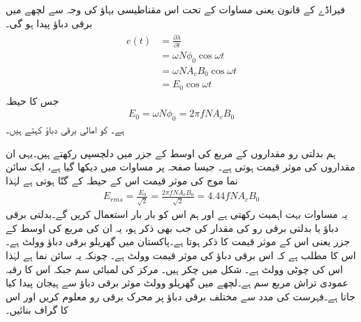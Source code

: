 فیراڈے کے قانون یعنی مساوات   کے تحت اس مقناطیسی بہاؤ کی وجہ سے لچھے میں  برقی دباؤ  پیدا ہو گی۔
\begin{gather}
\begin{aligned}
e(t)&=\frac{\partial \lambda}{\partial t}\\
&=\omega N \phi_0 \cos \omega t \\
&=\omega N A_c B_0 \cos \omega t\\
&=E_0 \cos \omega t
\end{aligned}
\end{gather}
جس کا حیطہ
\begin{align}
E_0=\omega N \phi_0=2 \pi f N A_c B_0
\end{align}
ہے۔ کو امالی برقی دباؤ کہتے ہیں۔ 

ہم بدلتی رو مقداروں کے مربع کی اوسط کے جزر  میں دلچسپی رکھتے ہیں۔یہی ان مقداروں کی موثر قیمت ہوتی ہے۔ جیسا صفحہ  پر مساوات   میں دیکھا گیا ہے، ایک سائن نما  موج کی موثر قیمت اس کے حیطہ کے   گنّا ہوتی ہے لہٰذا 
\begin{align}\label{مساوات_مقناطیسی_دور_پیدا_دباو_موثر_قیمت}
E_{rms}=\frac{E_0}{\sqrt{2}}=\frac{2 \pi f N A_c B_0}{\sqrt{2}}=4.44 f N A_c B_0
\end{align}
یہ مساوات بہت اہمیت رکھتی ہے اور ہم اس کو بار بار استعمال کریں گے۔بدلتی برقی دباؤ یا بدلتی برقی رو کی مقدار کی جب بھی ذکر ہو، یہ ان کی مربع کی اوسط کے جزر  یعنی اس کے موثر قیمت  کا ذکر ہوتا ہے۔پاکستان میں گھریلو برقی دباؤ  وولٹ ہے۔اس کا مطلب ہے کہ اس برقی دباؤ کی موثر قیمت  وولٹ ہے۔ چونکہ یہ سائن نما ہے لہٰذا اس کی چوٹی  وولٹ ہے۔
%
شکل میں  چکر ہیں۔ مرکز کی لمبائی  سم جبکہ اس کا رقبہ عمودی تراش  مربع سم ہے۔لچھے  میں گھریلو  وولٹ موثر برقی دباؤ سے ہیجان  پیدا کیا جاتا ہے۔فہرست کی مدد سے مختلف برقی دباؤ پر محرک برقی رو معلوم کریں اور اس کا گراف بنائیں۔


